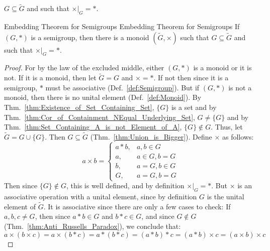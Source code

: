     $G\subseteq\tilde{G}$ and such that $\times|_{G}=*$.
    \begin{ltheorem}{Embedding Theorem for Semigroups}
                    {Embedding Theorem for Semigroups}
        If $(G,*)$ is a semigroup, then there is a monoid $(\tilde{G},\times)$
        such that $G\subseteq\tilde{G}$ and such that $\times|_{G}=*$.
    \end{ltheorem}
    \begin{proof}
        For by the law of the excluded middle, either $(G,*)$ is a monoid or it
        is not. If it is a monoid, then let $\tilde{G}=G$ and $\times=*$. If not
        then since it is a semigroup, $*$ must be associative
        (Def.~\ref{def:Semigroup}). But if $(G,*)$ is not a monoid, then there
        is no unital element (Def.~\ref{def:Monoid}). By
        Thm.~\ref{thm:Existence_of_Set_Containing_Set}, $\{G\}$ is a set and by
        Thm.~\ref{thm:Cor_of_Containment_NEqual_Underlying_Set}, $G\ne\{G\}$
        and by Thm.~\ref{thm:Set_Containing_A_is_not_Element_of_A},
        $\{G\}\notin{G}$. Thus, let $\tilde{G}=G\cup\{G\}$. Then
        $G\subseteq\tilde{G}$ (Thm.~\ref{thm:Union_is_Bigger}). Define
        $\times$ as follows:
        \begin{equation}
            a\times{b}=
            \begin{cases}
                a*b,&a,b\in{G}\\
                a,&a\in{G},b=G\\
                b,&a=G,b\in{G}\\
                G,&a=G,b=G
            \end{cases}
        \end{equation}
        Then since $\{G\}\notin{G}$, this is well defined, and by definition
        $\times|_{G}=*$. But $\times$ is an associative operation with a unital
        element, since by definition $G$ is the unital element of $\tilde{G}$.
        It is associative since there are only a few cases to check:
        If $a,b,c\ne{G}$, then since $a*b\in{G}$ and $b*c\in{G}$, and since
        $G\notin{G}$ (Thm.~\ref{thm:Anti_Russells_Paradox}), we conclude that:
        \begin{equation}
            a\times(b\times{c})=a\times(b*c)=a*(b*c)=(a*b)*c=
            (a*b)\times{c}=(a\times{b})\times{c}
        \end{equation}
    \end{proof}